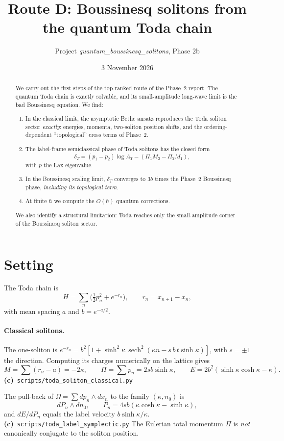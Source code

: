 \documentclass[11pt,a4paper]{article}
\title{Route D: Boussinesq solitons from the quantum Toda chain}
\author{Project \emph{quantum\_boussinesq\_solitons}, Phase 2b}
\date{3 November 2026}
\newcommand{\Lc}{\textsf{\textbf{(c)}}}\newcommand{\Ld}{\textsf{\textbf{(d)}}}
\newcommand{\script}[1]{\texttt{scripts/#1}}
\begin{document}
\maketitle
\begin{abstract}
We carry out the first steps of the top-ranked route of the Phase~2 report. The quantum Toda chain is exactly solvable, and its small-amplitude long-wave limit is the bad Boussinesq equation. We find:
\begin{enumerate}
\item In the classical limit, the asymptotic Bethe ansatz reproduces the Toda soliton sector \emph{exactly}: energies, momenta, two-soliton position shifts, and the ordering-dependent ``topological'' cross terms of Phase~2.
\item The label-frame semiclassical phase of Toda solitons has the closed form
\[
\delta_T=(p_1-p_2)\log A_T-(\Pi_1M_2-\Pi_2M_1),
\]
with $p$ the Lax eigenvalue.
\item In the Boussinesq scaling limit, $\delta_T$ converges to $3b$ times the Phase~2 Boussinesq phase, \emph{including its topological term}.
\item At finite $\hbar$ we compute the $O(\hbar)$ quantum corrections.
\end{enumerate}
We also identify a structural limitation: Toda reaches only the small-amplitude corner of the Boussinesq soliton sector.
\end{abstract}

\section{Setting}

The Toda chain is
\[
H=\sum_n\big(\tfrac12p_n^2+e^{-r_n}\big),\qquad r_n=x_{n+1}-x_n ,
\]
with mean spacing $a$ and $b=e^{-a/2}$.

\paragraph{Classical solitons.} The one-soliton is $e^{-r_n}=b^2[1+\sinh^2\kappa\,\operatorname{sech}^2(\kappa n-s\,b\,t\sinh\kappa)]$, with $s=\pm1$ the direction. Computing its charges numerically on the lattice gives
\[
M=\sum(r_n-a)=-2\kappa,\qquad \Pi=\sum p_n=2sb\sinh\kappa,\qquad E=2b^2(\sinh\kappa\cosh\kappa-\kappa) .
\]
\Lc\ \script{toda\_soliton\_classical.py}

The pull-back of $\Omega=\sum dp_n\wedge dx_n$ to the family $(\kappa,n_0)$ is
\[
dP_n\wedge dn_0,\qquad P_n=4sb(\kappa\cosh\kappa-\sinh\kappa),
\]
and $dE/dP_n$ equals the label velocity $b\sinh\kappa/\kappa$. \Lc\ \script{toda\_label\_symplectic.py} The Eulerian total momentum $\Pi$ is \emph{not} canonically conjugate to the soliton position.
\end{document}
